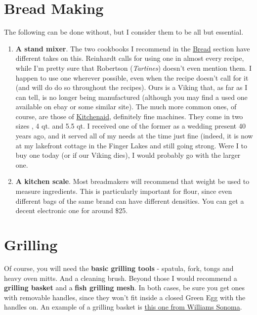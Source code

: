 \documentclass[
]{book}
\providecommand{\tightlist}{%
  \setlength{\itemsep}{0pt}\setlength{\parskip}{0pt}}
\begin{document}
\hypertarget{bread-making}{%
\section{Bread Making}\label{bread-making}}

The following can be done without, but I consider them to be all but essential.

\begin{enumerate}
\def\labelenumi{\arabic{enumi}.}
\tightlist
\item
  \textbf{A stand mixer}. The two cookbooks I recommend in the \protect\hyperlink{bread}{Bread} section have different takes on this. Reinhardt calls for using one in almost every recipe, while I'm pretty sure that Robertson (\emph{Tartines}) doesn't even mention them. I happen to use one wherever possible, even when the recipe doesn't call for it (and will do do so throughout the recipes). Ours is a Viking that, as far as I can tell, is no longer being manufactured (although you may find a used one available on ebay or some similar site). The much more common ones, of course, are those of \href{https://www.kitchenaid.com/countertop-appliances/stand-mixers.html}{Kitchenaid}, definitely fine machines. They come in two sizes , 4 qt. and 5.5 qt. I received one of the former as a wedding present 40 years ago, and it served all of my needs at the time just fine (indeed, it is now at my lakefront cottage in the Finger Lakes and still going strong. Were I to buy one today (or if our Viking dies), I would probably go with the larger one.
\item
  \textbf{A kitchen scale}. Most breadmakers will recommend that weight be used to measure ingredients. This is particularly important for flour, since even different bags of the same brand can have different densities. You can get a decent electronic one for around \$25.
\end{enumerate}

\hypertarget{grilling}{%
\section{Grilling}\label{grilling}}

Of course, you will need the \textbf{basic grilling tools} - spatula, fork, tongs and heavy oven mitts. And a cleaning brush. Beyond those I would recommend a \textbf{grilling basket} and a \textbf{fish grilling mesh}. In both cases, be sure you get ones with removable handles, since they won't fit inside a closed Green Egg with the handles on. An example of a grilling basket is \href{https://www.williams-sonoma.com/products/outset-chefs-outdoor-grill-basket-skillet-handles/}{this one from Williams Sonoma}.
\end{document}
